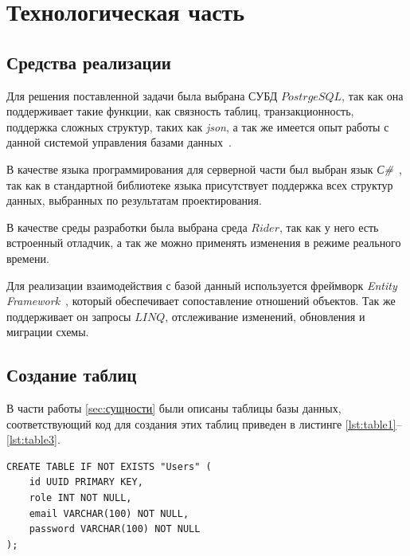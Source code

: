 \chapter{Технологическая часть}

\section{Средства реализации}

Для решения поставленной задачи была выбрана СУБД $PostrgeSQL$, так как она поддерживает такие функции, как связность таблиц, транзакционность, поддержка сложных структур, таких как \textit{json}, а так же имеется опыт работы с данной системой управления базами данных~\cite{postgres}.

В качестве языка программирования для серверной части был выбран язык \textit{С\#}~\cite{csharp}, так как в стандартной библиотеке языка присутствует поддержка всех структур данных, выбранных по результатам проектирования.

В качестве среды разработки была выбрана среда $Rider$, так как у него есть встроенный отладчик, а так же можно применять изменения в режиме реального времени.

Для реализации взаимодействия с базой данный используется фреймворк \textit{Entity Framework}~\cite{entity}, который обеспечивает сопоставление отношений объектов. Так же поддерживает он запросы $LINQ$, отслеживание изменений, обновления и миграции схемы.


\section{Создание таблиц}

В части работы \ref{sec:сущности} были описаны таблицы базы данных, соответствующий код для создания этих таблиц приведен в листинге \ref{lst:table1}--\ref{lst:table3}.

\begin{center}
	\captionsetup{justification=raggedright,singlelinecheck=off}
	\begin{lstlisting}[label=lst:table1,caption={Код на SQL для создания таблицы Users}]
CREATE TABLE IF NOT EXISTS "Users" (
	id UUID PRIMARY KEY,
	role INT NOT NULL,
	email VARCHAR(100) NOT NULL,
	password VARCHAR(100) NOT NULL
);
	\end{lstlisting}
\end{center}
\clearpage

